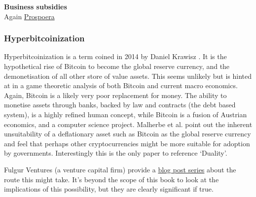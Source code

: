 \textbf{Business subsidies}\\
Again \href{https://davisclute.medium.com/visiting-a-startup-city-in-honduras-73d9c026ee6d}{Prospoera}
\subsubsection{Hyperbitcoinization}
Hyperbitcoinization is a term coined in 2014 by Daniel Krawisz \cite{krawisz2014hyperbitcoinization}. It is the hypothetical rise of Bitcoin to become the global reserve currency, and the demonetisation of all other store of value assets. This seems unlikely but is hinted at in a game theoretic analysis of both Bitcoin and current macro economics. Again, Bitcoin is a likely very poor replacement for money. The ability to monetise assets through banks, backed by law and contracts (the debt based system), is a highly refined human concept, while Bitcoin is a fusion of Austrian economics, and a computer science project. Malherbe et al. point out the inherent unsuitability of a deflationary asset such as Bitcoin as the global reserve currency \cite{malherbe2019cryptocurrencies} and feel that perhaps other cryptocurrencies might be more suitable for adoption by governments.  Interestingly this is the only paper to reference `Duality'.\par  Fulgur Ventures (a venture capital firm) provide a \href{https://medium.com/@fulgur.ventures/the-roads-to-hyperbitcoinization-part-1-27dc84d0e5e5}{blog post series} about the route this might take. It's beyond the scope of this book to look at the implications of this possibility, but they are clearly significant if true. 

